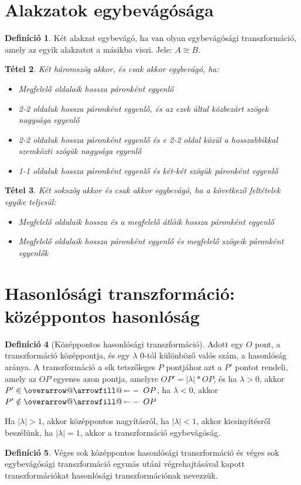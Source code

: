 \documentclass[twoside,12pt]{report}
\makeatletter
\newcommand{\ray}{%
	\mathpalette {\overarrow@\rayfill@}}
\def\rayfill@{\arrowfill@{\mkern4mu\mapstochar\relbar}\relbar{\mkern 4.08mu}}%
\newtheorem{theorem}{Tétel}[section]
\theoremstyle{definition}
\newtheorem{definition}[theorem]{Definíció}
\makeatother
\begin{document}
\section{Alakzatok egybevágósága}
	\begin{definition}
		Két alakzat egybevágó, ha van olyan egybevágósági transzformáció, amely az egyik alakzatot a másikba viszi. Jele: $A\cong B$.
	\end{definition}
	\begin{theorem}
		Két háromszög akkor, és csak akkor egybevágó, ha:
		\begin{itemize}
			\item Megfelelő oldalaik hossza páronként egyenlő
			\item 2-2 oldaluk hossza páronként egyenlő, és az ezek által közbezárt szögek nagysága egyenlő
			\item 2-2 oldaluk hossza páronként egyenlő és e 2-2 oldal közül a hosszabbikkal szemközti szögük nagysága egyenlő
			\item 1-1 oldaluk hossza páronként egyenlő és két-két szögük páronként egyenlő
		\end{itemize}
	\end{theorem}
	\begin{theorem}
		Két sokszög akkor és csak akkor egybevágó, ha a következő feltételek egyike teljesül:
		\begin{itemize}
			\item Megfelelő oldalaik hossza és a megfelelő átlóik hossza páronként egyenlő
			\item Megfelelő oldalaik hossza páronként egyenlő és megfelelő szögeik páronként egyenlők
		\end{itemize}
	\end{theorem}
\section{Hasonlósági transzformáció: középpontos hasonlóság}
	\begin{definition}[Középpontos hasonlósági transzformáció]
		Adott egy $O$ pont, a transzformáció középpontja, és egy $\lambda$ 0-tól különböző valós szám, a hasonlóság aránya. A transzformáció a sík tetszőleges $P$ pontjához azt a $P'$ pontot rendeli, amely az $OP$ egyenes azon pontja, amelyre $OP'=|\lambda|*OP$, és ha $\lambda>0$, akkor $P'\in\ray{OP}$, ha $\lambda<0$, akkor $P'\notin \ray{OP}$ 
	\end{definition}
	Ha $|\lambda|>1$, akkor középpontos nagyításról, ha $|\lambda|<1$, akkor kicsinyítésről beszélünk, ha $|\lambda|=1$, akkor a transzformáció egybevágóság.
	\begin{definition}
		Véges sok középpontos hasonlósági transzformáció és véges sok egybevágósági transzformáció
		egymás utáni végrehajtásával kapott transzformációkat hasonlósági transzformációnak nevezzük.
	\end{definition}
\end{document}
